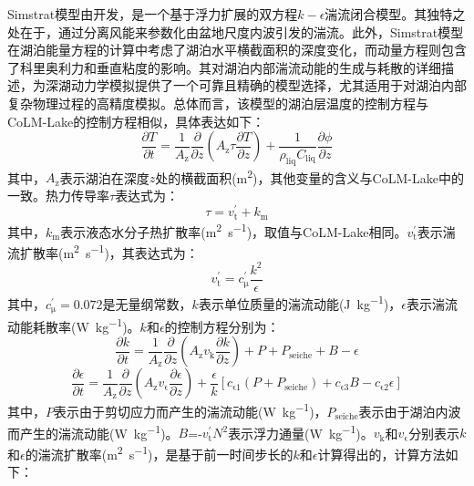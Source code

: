 Simstrat模型由\citet{goudsmit2002application}开发，是一个基于浮力扩展的双方程$k-\epsilon$湍流闭合模型。其独特之处在于，通过分离风能来参数化由盆地尺度内波引发的湍流。此外，Simstrat模型在湖泊能量方程的计算中考虑了湖泊水平横截面积的深度变化，而动量方程则包含了科里奥利力和垂直粘度的影响。其对湖泊内部湍流动能的生成与耗散的详细描述，为深湖动力学模拟提供了一个可靠且精确的模型选择，尤其适用于对湖泊内部复杂物理过程的高精度模拟。总体而言，该模型的湖泊层温度的控制方程与CoLM-Lake的控制方程相似，具体表达如下：
\begin{equation}
    \frac{\partial T}{\partial t}=\frac{1}{A_{\mathrm{z}}} \frac{\partial}{\partial z}\left(A_{\mathrm{z}} \tau \frac{\partial T}{\partial z}\right)+\frac{1}{\rho_{\mathrm{liq}} C_{\mathrm{liq}}} \frac{\partial \phi}{\partial z}
\end{equation}
其中，$A_{\mathrm{z}}$表示湖泊在深度$z$处的横截面积(\unit{m^2})，其他变量的含义与CoLM-Lake中的一致。热力传导率$\tau$表达式为：
\begin{equation}
    \tau = v^{\mathrm{'}}_{\mathrm{t}} + k_{\mathrm{m}}
\end{equation}
其中，$k_{\mathrm{m}}$表示液态水分子热扩散率(\unit{m^2.s^{-1}})，取值与CoLM-Lake相同。$v^{\mathrm{'}}_{\mathrm{t}}$表示湍流扩散率(\unit{m^2.s^{-1}})，其表达式为：
\begin{equation}
    v^{\mathrm{'}}_{\mathrm{t}} = c^{\mathrm{'}}_{\mathrm{\mu}}\frac{k^\mathrm{2}}{\epsilon}
\end{equation}
其中，$c^{\mathrm{'}}_{\mathrm{\mu}}=0.072$是无量纲常数，$k$表示单位质量的湍流动能(\unit{J.kg^{-1}})，$\epsilon$表示湍流动能耗散率(\unit{W.kg^{-1}})。$k$和$\epsilon$的控制方程分别为：
\begin{equation}
    \frac{\partial k}{\partial t} = \frac{1}{A_{\mathrm{z}}}\frac{\partial}{\partial z}\left(A_{\mathrm{z}} v_{\mathrm{k}} \frac{\partial k}{\partial z}\right) + P + P_{\mathrm{seiche}} + B - \epsilon
\end{equation}
\begin{equation}
    \frac{\partial \epsilon}{\partial t} = \frac{1}{A_{\mathrm{z}}}\frac{\partial}{\partial z}\left(A_{\mathrm{z}} v_{\mathrm{\epsilon}} \frac{\partial \epsilon}{\partial z}\right) + \frac{\epsilon}{k}\left[c_{\mathrm{\epsilon 1}} \left(P + P_{\mathrm{seiche}}\right) + c_{\mathrm{\epsilon 3}} B - c_{\mathrm{\epsilon 2}} \epsilon\right]
\end{equation}
其中，$P$表示由于剪切应力而产生的湍流动能(\unit{W.kg^{-1}})，$P_{\mathrm{seiche}}$表示由于湖泊内波而产生的湍流动能(\unit{W.kg^{-1}})。$B$=-$v^{\mathrm{'}}_{\mathrm{t}} N^2$表示浮力通量(\unit{W.kg^{-1}})。$v_{\mathrm{k}}$和$v_{\mathrm{\epsilon}}$分别表示$k$和$\epsilon$的湍流扩散率(\unit{m^2.s^{-1}})，是基于前一时间步长的$k$和$\epsilon$计算得出的，计算方法如下：
